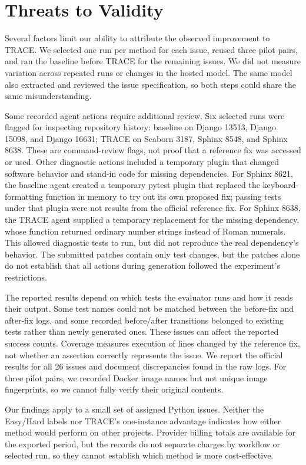 \section{Threats to Validity}
Several factors limit our ability to attribute the observed improvement to TRACE. We selected one run per method for each issue, reused three pilot pairs, and ran the baseline before TRACE for the remaining issues. We did not measure variation across repeated runs or changes in the hosted model. The same model also extracted and reviewed the issue specification, so both steps could share the same misunderstanding.

Some recorded agent actions require additional review. Six selected runs were flagged for inspecting repository history: baseline on Django 13513, Django 15098, and Django 16631; TRACE on Seaborn 3187, Sphinx 8548, and Sphinx 8638. These are command-review flags, not proof that a reference fix was accessed or used. Other diagnostic actions included a temporary plugin that changed software behavior and stand-in code for missing dependencies. For Sphinx 8621, the baseline agent created a temporary pytest plugin that replaced the keyboard-formatting function in memory to try out its own proposed fix; passing tests under that plugin were not results from the official reference fix. For Sphinx 8638, the TRACE agent supplied a temporary replacement for the missing  dependency, whose  function returned ordinary number strings instead of Roman numerals. This allowed diagnostic tests to run, but did not reproduce the real dependency's behavior. The submitted patches contain only test changes, but the patches alone do not establish that all actions during generation followed the experiment's restrictions.

The reported results depend on which tests the evaluator runs and how it reads their output. Some test names could not be matched between the before-fix and after-fix logs, and some recorded before/after transitions belonged to existing tests rather than newly generated ones. These issues can affect the reported success counts. Coverage measures execution of lines changed by the reference fix, not whether an assertion correctly represents the issue. We report the official results for all 26 issues and document discrepancies found in the raw logs. For three pilot pairs, we recorded Docker image names but not unique image fingerprints, so we cannot fully verify their original contents.

Our findings apply to a small set of assigned Python issues. Neither the Easy/Hard labels nor TRACE's one-instance advantage indicates how either method would perform on other projects. Provider billing totals are available for the exported period, but the records do not separate charges by workflow or selected run, so they cannot establish which method is more cost-effective.

